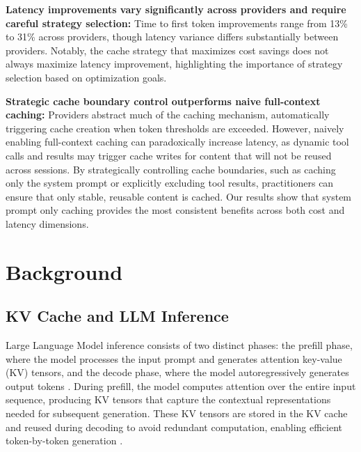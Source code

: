 \documentclass{article}
\theoremstyle{plain}
\theoremstyle{definition}
\theoremstyle{remark}
\begin{document}
\textbf{Latency improvements vary significantly across providers and require careful strategy selection:} Time to first token improvements range from 13\% to 31\% across providers, though latency variance differs substantially between providers. Notably, the cache strategy that maximizes cost savings does not always maximize latency improvement, highlighting the importance of strategy selection based on optimization goals.

\textbf{Strategic cache boundary control outperforms naive full-context caching:} Providers abstract much of the caching mechanism, automatically triggering cache creation when token thresholds are exceeded. However, naively enabling full-context caching can paradoxically increase latency, as dynamic tool calls and results may trigger cache writes for content that will not be reused across sessions. By strategically controlling cache boundaries, such as caching only the system prompt or explicitly excluding tool results, practitioners can ensure that only stable, reusable content is cached. Our results show that system prompt only caching provides the most consistent benefits across both cost and latency dimensions.

\section{Background}
\label{sec:background}


\subsection{KV Cache and LLM Inference}
\label{subsec:kv_cache}

Large Language Model inference consists of two distinct phases: the prefill phase, where the model processes the input prompt and generates attention key-value (KV) tensors, and the decode phase, where the model autoregressively generates output tokens \citep{pope2022efficiently}. During prefill, the model computes attention over the entire input sequence, producing KV tensors that capture the contextual representations needed for subsequent generation. These KV tensors are stored in the KV cache and reused during decoding to avoid redundant computation, enabling efficient token-by-token generation \citep{notlain2025kvcaching}.
\end{document}
